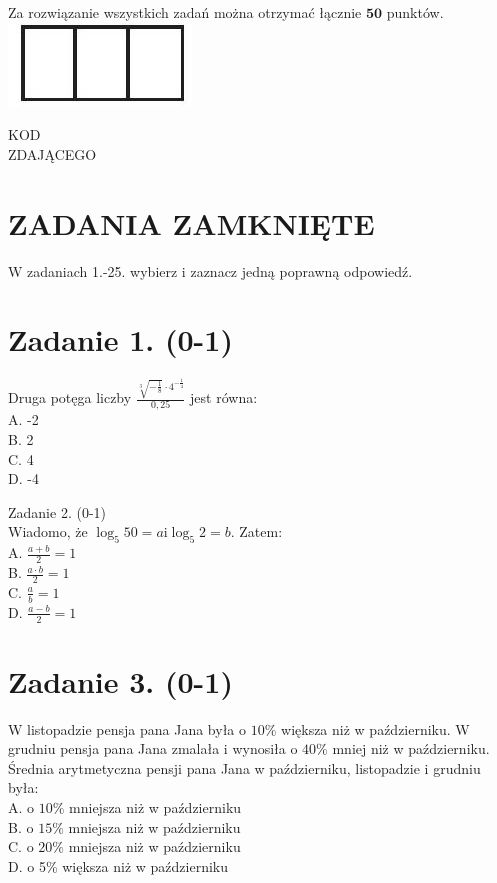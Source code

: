 \documentclass[10pt]{article}
\begin{document}
Za rozwiązanie wszystkich zadań można otrzymać łącznie \(\mathbf{5 0}\) punktów.\\
\includegraphics[max width=\textwidth, center]{2024_11_21_99eb8e6624b497a5af43g-01}

KOD\\
ZDAJĄCEGO

\section*{ZADANIA ZAMKNIĘTE}
W zadaniach 1.-25. wybierz i zaznacz jedną poprawną odpowiedź.

\section*{Zadanie 1. (0-1)}
Druga potęga liczby \(\frac{\sqrt[3]{-\frac{1}{8}} \cdot 4^{-\frac{1}{4}}}{0,25}\) jest równa:\\
A. -2\\
B. 2\\
C. 4\\
D. -4

Zadanie 2. (0-1)\\
Wiadomo, że \(\log _{5} 50=a \mathrm{i} \log _{5} 2=b\). Zatem:\\
A. \(\frac{a+b}{2}=1\)\\
B. \(\frac{a \cdot b}{2}=1\)\\
C. \(\frac{a}{b}=1\)\\
D. \(\frac{a-b}{2}=1\)

\section*{Zadanie 3. (0-1)}
W listopadzie pensja pana Jana była o \(10 \%\) większa niż w październiku. W grudniu pensja pana Jana zmalała i wynosiła o \(40 \%\) mniej niż w październiku. Średnia arytmetyczna pensji pana Jana w październiku, listopadzie i grudniu była:\\
A. o \(10 \%\) mniejsza niż w październiku\\
B. o \(15 \%\) mniejsza niż w październiku\\
C. o \(20 \%\) mniejsza niż w październiku\\
D. o 5\% większa niż w październiku
\end{document}
